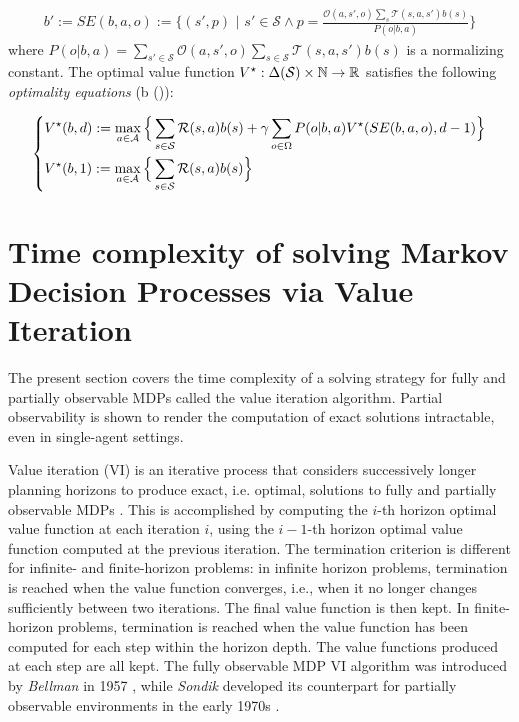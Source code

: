 \begin{align}
\label{eq:belief}
    b' := SE(b,a,o) := \Big\{(s',p) \,\,\Big| \,\,s' \in \mathcal{S} \land p =  \frac{\mathcal{O}(a,s',o) \sum_{s} \mathcal{T}(s,a,s') b(s)}
    {P(o | b, a)} \Big\}
\end{align}
where $P(o | b,a) = \sum_{s' \in \mathcal{S}} \mathcal{O}(a,s',o) \sum_{s \in \mathcal{S}} \mathcal{T}(s,a,s') b(s)$ is a normalizing constant.
The optimal value function $V^{\star} : \Delta(\mathcal{S}) \times \mathbb{N} \rightarrow \mathbb{R}$ satisfies the following \textit{optimality equations} (\forall b \in \Delta()):

\begin{align}
        \begin{dcases}
            V^{\star}(b, d) := \max_{a \in \mathcal{A}} \Big\{ \sum_{s \in \mathcal{S}}\mathcal{R}(s,a) b(s) + \gamma \sum_{o \in \Omega} P(o | b,a) V^{\star}(SE(b,a,o), d-1) \Big\}  
            \\
            V^{\star}(b, 1) := \max_{a \in \mathcal{A}} \Big\{ \sum_{s \in \mathcal{S}}\mathcal{R}(s,a) b(s) \Big\} 
        \end{dcases}
    \end{align}


\section{Time complexity of solving Markov Decision Processes via Value Iteration}
\label{sec:intract}
The present section covers the time complexity of a solving strategy for fully and partially observable MDPs called the value iteration algorithm. Partial observability is shown to render the computation of exact solutions intractable, even in single-agent settings.

Value iteration (VI) is an iterative process that considers successively longer planning horizons to produce exact, i.e. optimal, solutions to fully and partially observable MDPs \cite{phdthesispomdp}. This is accomplished by computing the $i$-th horizon optimal value function at each iteration $i$, using the $i-1$-th horizon optimal value function computed at the previous iteration. The termination criterion is different for infinite- and finite-horizon problems: in infinite horizon problems, termination is reached when the value function converges, i.e., when it no longer changes sufficiently between two iterations. The final value function is then kept. In finite-horizon problems, termination is reached when the value function has been computed for each step within the horizon depth. The value functions produced at each step are all kept. The fully observable MDP VI algorithm was introduced by \textit{Bellman} in 1957 \cite{Bellman:1957}, while \textit{Sondik} developed its counterpart for partially observable environments in the early 1970s \cite{sondik1973}.
